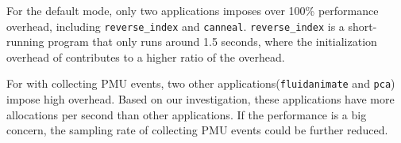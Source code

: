 For the default mode, only two applications imposes over 100\% performance overhead, including \texttt{reverse\_index} and \texttt{canneal}. \texttt{reverse\_index} is a short-running program that only runs around 1.5 seconds, where the initialization overhead of \MP{} contributes to a higher ratio of the overhead.  

For \MP{} with collecting PMU events, two other applications(\texttt{fluidanimate} and \texttt{pca}) impose high overhead. Based on our investigation, these applications have more allocations per second than other applications. If the performance is a big concern, the sampling rate of collecting  PMU events could be further reduced. 


